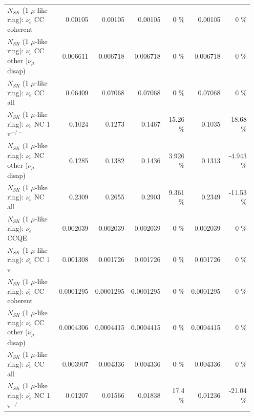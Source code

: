 \begin{table}
\begin{tabular}{| l | r | r | r  r | r  r |}
                               $N_{SK}$ (1 $\mu$-like ring): $\nu_e$ CC coherent &         0.00105 &         0.00105 &         0.00105 &        0 \%  &         0.00105 &        0 \%  \\ 
                $N_{SK}$ (1 $\mu$-like ring): $\nu_e$ CC other ($\nu_\mu$ disap) &        0.006611 &        0.006718 &        0.006718 &        0 \%  &        0.006718 &        0 \%  \\ 
                                  $N_{SK}$ (1 $\mu$-like ring): $\nu_{e}$ CC all &         0.06409 &         0.07068 &         0.07068 &        0 \%  &         0.07068 &        0 \%  \\ 
\hline
                           $N_{SK}$ (1 $\mu$-like ring): $\nu_e$ NC 1$\pi^{+/-}$ &          0.1024 &          0.1273 &          0.1467 &    15.26 \%  &          0.1035 &   -18.68 \%  \\ 
                $N_{SK}$ (1 $\mu$-like ring): $\nu_e$ NC other ($\nu_\mu$ disap) &          0.1285 &          0.1382 &          0.1436 &    3.926 \%  &          0.1313 &   -4.943 \%  \\ 
                                  $N_{SK}$ (1 $\mu$-like ring): $\nu_{e}$ NC all &          0.2309 &          0.2655 &          0.2903 &    9.361 \%  &          0.2349 &   -11.53 \%  \\ 
\hline
\hline
\hline
                                $N_{SK}$ (1 $\mu$-like ring): $\bar{\nu_e}$ CCQE &        0.002039 &        0.002039 &        0.002039 &        0 \%  &        0.002039 &        0 \%  \\ 
                           $N_{SK}$ (1 $\mu$-like ring): $\bar{\nu_e}$ CC 1$\pi$ &        0.001308 &        0.001726 &        0.001726 &        0 \%  &        0.001726 &        0 \%  \\ 
                         $N_{SK}$ (1 $\mu$-like ring): $\bar{\nu_e}$ CC coherent &       0.0001295 &       0.0001295 &       0.0001295 &        0 \%  &       0.0001295 &        0 \%  \\ 
          $N_{SK}$ (1 $\mu$-like ring): $\bar{\nu_e}$ CC other ($\nu_\mu$ disap) &       0.0004306 &       0.0004415 &       0.0004415 &        0 \%  &       0.0004415 &        0 \%  \\ 
                            $N_{SK}$ (1 $\mu$-like ring): $\bar{\nu_{e}}$ CC all &        0.003907 &        0.004336 &        0.004336 &        0 \%  &        0.004336 &        0 \%  \\ 
\hline
                     $N_{SK}$ (1 $\mu$-like ring): $\bar{\nu_e}$ NC 1$\pi^{+/-}$ &         0.01207 &         0.01566 &         0.01838 &     17.4 \%  &         0.01236 &   -21.04 \%  \\ 

\end{tabular}
\end{table}
